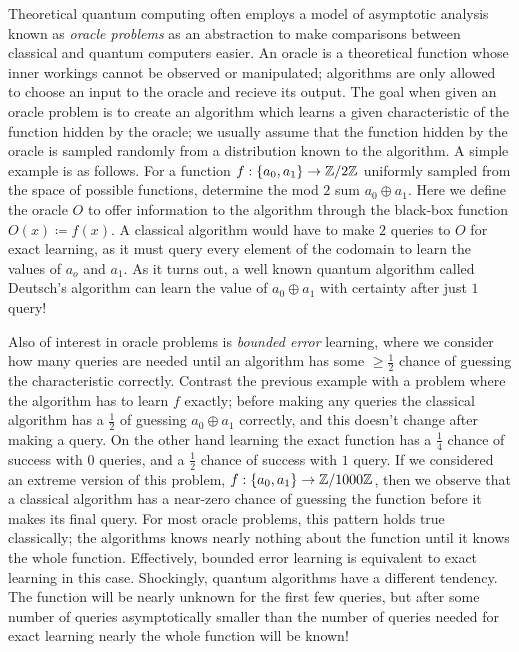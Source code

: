 \documentclass[12pt,twoside]{reedthesis}
\theoremstyle{plain}   %
\theoremstyle{definition}
\theoremstyle{remark}
\numberwithin{equation}{section}
\begin{document}
  Theoretical quantum computing often employs a model
  of asymptotic analysis known as \emph{oracle problems} as an abstraction to make comparisons between classical and quantum computers easier.
  An oracle is a theoretical function whose inner workings cannot be observed or manipulated; algorithms are only allowed to choose an input to the oracle and recieve its output.
  The goal when given an oracle problem is to create an algorithm which learns a given characteristic of the function hidden by the oracle;
  we usually assume that the function hidden by the oracle is sampled randomly from a distribution known to the algorithm.
  A simple example is as follows. For a function $f: \{a_0, a_1 \} \to \mathbb{Z} / 2\mathbb{Z}$ uniformly sampled from the space of possible functions, determine the mod $2$ sum $a_0 \oplus a_1$.
  Here we define the oracle $O$ to offer information to the algorithm through the black-box function $O(x) \coloneq f(x)$.
  A classical algorithm would have to make $2$ queries to $O$ for exact learning, as it must query every element of the codomain to learn the values of $a_o$ and $a_1$.
  As it turns out, a well known quantum algorithm called Deutsch's algorithm can learn the value of $a_0 \oplus a_1$ with certainty after just $1$ query! \par
  Also of interest in oracle problems is \emph{bounded error} learning, where we consider how many queries are needed until an algorithm has some $\geq \frac{1}{2}$ chance of guessing the characteristic correctly.
  Contrast the previous example with a problem where the algorithm has to learn $f$ exactly; before making any queries the classical algorithm has a $\frac{1}{2}$ of guessing $a_0 \oplus a_1$ correctly,
  and this doesn't change after making a query. On the other hand learning the exact function has a $\frac{1}{4}$ chance of success with $0$ queries, and a $\frac{1}{2}$ chance of success with $1$ query.
  If we considered an extreme version of this problem, $f: \{a_0, a_1 \} \to \mathbb{Z} / 1000\mathbb{Z}$, then we observe that a classical algorithm has a near-zero chance of guessing the function before it makes its final query.
  For most oracle problems, this pattern holds true classically; the algorithms knows nearly nothing about the function until it knows the whole function.
  Effectively, bounded error learning is equivalent to exact learning in this case.
  Shockingly, quantum algorithms have a different tendency.
  The function will be nearly unknown for the first few queries, but after some number of queries asymptotically smaller than the number of queries needed for exact learning nearly the whole function will be known!
\end{document}
